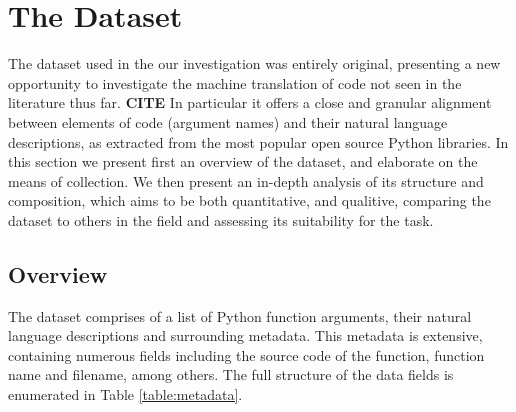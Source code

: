 \chapter{The Dataset}
\label{the_dataset}



The dataset used in the our investigation was entirely original, presenting a new opportunity to investigate the machine translation of code not seen in the literature thus far. \textbf{CITE}
In particular it offers a close and granular alignment between elements of code (argument names) and their natural language descriptions, as extracted from the most popular open source Python libraries.
In this section we present first an overview of the dataset, and elaborate on  the means of collection. 
We then present an in-depth analysis of its structure and composition, which aims to be both quantitative, and qualitive, comparing the dataset to others in the field and assessing its suitability for the task. 

\section{Overview} %
\label{sec:overview}

The dataset comprises of a list of Python function arguments, their natural language descriptions and surrounding metadata. 
This metadata is extensive, containing numerous fields including the source code of the function, function name and filename, among others. 
The full structure of the data fields is enumerated in Table \ref{table:metadata}. 

